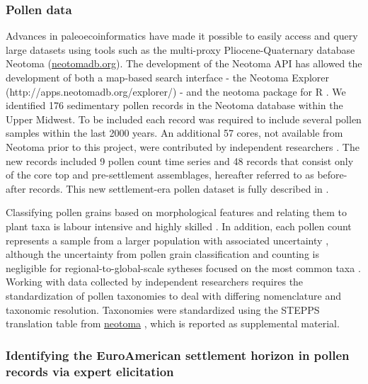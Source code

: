\documentclass[12pt]{article}
\begin{document}

\subsubsection{Pollen data}

Advances in paleoecoinformatics \citep{brewer2012paleoecoinformatic,
  grimm2013encyclopedia} have made it possible to easily access and
query large datasets using tools such as the multi-proxy
Pliocene-Quaternary database Neotoma (\url{neotomadb.org}). The
development of the Neotoma API has allowed the development of both a
map-based search interface - the Neotoma Explorer
(http://apps.neotomadb.org/explorer/) - and the neotoma package for R
\citep{goring2015}. We identified 176 sedimentary pollen records in
the Neotoma database within the Upper Midwest. To be included each
record was required to include several pollen samples within the last
2000 years.  An additional 57 cores, not available from Neotoma prior
to this project, were contributed by independent researchers
\citep{kujawa2015}. The new records included 9 pollen count time
series and 48 records that consist only of the core top and
pre-settlement assemblages, hereafter referred to as before-after
records. This new settlement-era pollen dataset is fully described in
\citet{kujawa2015}.

Classifying pollen grains based on morphological features and relating
them to plant taxa is labour intensive and highly skilled
\citep{havinga1964, havinga1984}. In addition, each pollen count
represents a sample from a larger population with associated
uncertainty \citep{maher2012assessment, maher1981statistics}, although
the uncertainty from pollen grain classification and counting is
negligible for regional-to-global-scale sytheses focused on the most
common taxa \citep{webb1978sensing, webb1978mapped}. Working with data
collected by independent researchers requires the standardization of
pollen taxonomies to deal with differing nomenclature and taxonomic
resolution. Taxonomies were standardized using the STEPPS translation
table from \url{neotoma} \citep{goring}, which is reported as
supplemental material.

\subsubsection{Identifying the EuroAmerican settlement horizon in pollen records via expert elicitation}
\end{document}
